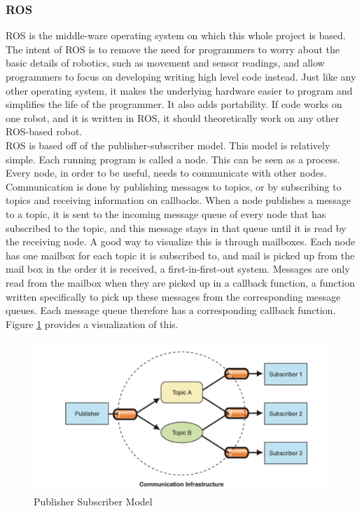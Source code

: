 \documentclass{article}
\newcommand\tab[1][0.5cm]{\hspace*{#1}}
\begin{document}
\subsubsection{ROS} \label{ROSMod}
\tab ROS is the middle-ware operating system on which this whole project is based. The intent of ROS is to remove the need for programmers to worry about the basic details of robotics, such as movement and sensor readings, and allow programmers to focus on developing writing high level code instead. Just like any other operating system, it makes the underlying hardware easier to program and simplifies the life of the programmer. It also adds portability. If code works on one robot, and it is written in ROS, it should theoretically work on any other ROS-based robot.\\

ROS is based off of the publisher-subscriber model. This model is relatively simple. Each running program is called a node. This can be seen as a process. Every node, in order to be useful, needs to communicate with other nodes. Communication is done by publishing messages to topics, or by subscribing to topics and receiving information on callbacks. When a node publishes a message to a topic, it is sent to the incoming message queue of every node that has subscribed to the topic, and this message stays in that queue until it is read by the receiving node. A good way to visualize this is through mailboxes. Each node has one mailbox for each topic it is subscribed to, and mail is picked up from the mail box in the order it is received, a first-in-first-out system. Messages are only read from the mailbox when they are picked up in a callback function, a function written specifically to pick up these messages from the corresponding message queues. Each message queue therefore has a corresponding callback function. Figure \ref{fig:pubsub} provides a visualization of this.\\

\begin{figure}[h!]
\centering
\includegraphics[scale=0.8]{pub_sub_model.png}
\caption{Publisher Subscriber Model}
\label{fig:pubsub}
\end{figure}
\end{document}
